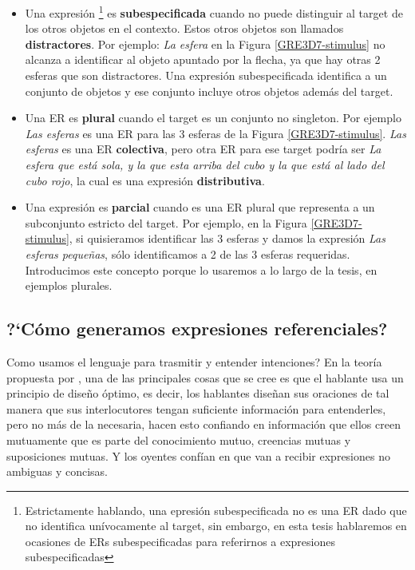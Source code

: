 \begin{itemize}
\item Una expresi\'on \footnote{Estrictamente hablando, una epresi\'on subespecificada no es una ER dado que no identifica un\'ivocamente al target, sin embargo, en esta tesis hablaremos en ocasiones de ERs subespecificadas para referirnos a expresiones subespecificadas} es {\bf subespecificada} cuando no puede distinguir al target de los otros objetos en el contexto. Estos otros objetos son llamados \textbf{distractores}. Por ejemplo: {\it La esfera} en la Figura \ref{GRE3D7-stimulus} no alcanza a identificar al objeto apuntado por la flecha, ya que hay otras 2 esferas que son distractores. Una expresi\'on subespecificada identifica a un conjunto de objetos y ese conjunto incluye otros objetos adem\'as del target.

\item Una ER es {\bf plural} cuando el target es un conjunto no singleton. Por ejemplo {\it Las esferas} es una ER para las 3 esferas de la Figura \ref{GRE3D7-stimulus}. {\it Las esferas} es una ER \textbf{colectiva}, pero otra ER para ese target podr\'ia ser {\it La esfera que est\'a sola, y la que esta arriba del cubo y la que est\'a al lado del cubo rojo}, la cual es una expresi\'on \textbf{distributiva}.

\item Una expresi\'on es {\bf parcial} cuando es una ER plural que representa a un subconjunto estricto del target. Por ejemplo, en la Figura \ref{GRE3D7-stimulus}, si quisieramos identificar las 3 esferas y damos la expresi\'on {\it Las esferas peque\~nas}, s\'olo identificamos a 2 de las 3 esferas requeridas. Introducimos este concepto porque lo usaremos a lo largo de la tesis, en ejemplos plurales. 
\end{itemize}

\subsection{?`C\'omo generamos expresiones referenciales?}
\label{sec:psicolinguistica}

Como usamos el lenguaje para trasmitir y entender intenciones? En la teor\'ia propuesta por \cite{clark1992arenas}, \cite{Clark-Marshall81} una de las principales cosas que se cree es que el hablante usa un principio de dise\~no \'optimo, es decir, los hablantes dise\~nan sus oraciones de tal manera que sus interlocutores tengan suficiente informaci\'on para entenderles, pero no m\'as de la necesaria, hacen esto confiando en informaci\'on que ellos creen mutuamente que es parte del conocimiento mutuo, creencias mutuas y suposiciones mutuas. Y los oyentes conf\'ian en que van a recibir expresiones no ambiguas y concisas. 

